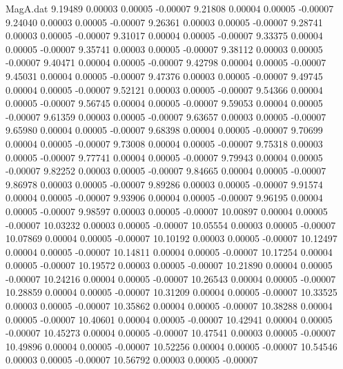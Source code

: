 \begin{filecontents}{MagA.dat}
   9.19489    0.00003    0.00005   -0.00007
   9.21808    0.00004    0.00005   -0.00007
   9.24040    0.00003    0.00005   -0.00007
   9.26361    0.00003    0.00005   -0.00007
   9.28741    0.00003    0.00005   -0.00007
   9.31017    0.00004    0.00005   -0.00007
   9.33375    0.00004    0.00005   -0.00007
   9.35741    0.00003    0.00005   -0.00007
   9.38112    0.00003    0.00005   -0.00007
   9.40471    0.00004    0.00005   -0.00007
   9.42798    0.00004    0.00005   -0.00007
   9.45031    0.00004    0.00005   -0.00007
   9.47376    0.00003    0.00005   -0.00007
   9.49745    0.00004    0.00005   -0.00007
   9.52121    0.00003    0.00005   -0.00007
   9.54366    0.00004    0.00005   -0.00007
   9.56745    0.00004    0.00005   -0.00007
   9.59053    0.00004    0.00005   -0.00007
   9.61359    0.00003    0.00005   -0.00007
   9.63657    0.00003    0.00005   -0.00007
   9.65980    0.00004    0.00005   -0.00007
   9.68398    0.00004    0.00005   -0.00007
   9.70699    0.00004    0.00005   -0.00007
   9.73008    0.00004    0.00005   -0.00007
   9.75318    0.00003    0.00005   -0.00007
   9.77741    0.00004    0.00005   -0.00007
   9.79943    0.00004    0.00005   -0.00007
   9.82252    0.00003    0.00005   -0.00007
   9.84665    0.00004    0.00005   -0.00007
   9.86978    0.00003    0.00005   -0.00007
   9.89286    0.00003    0.00005   -0.00007
   9.91574    0.00004    0.00005   -0.00007
   9.93906    0.00004    0.00005   -0.00007
   9.96195    0.00004    0.00005   -0.00007
   9.98597    0.00003    0.00005   -0.00007
  10.00897    0.00004    0.00005   -0.00007
  10.03232    0.00003    0.00005   -0.00007
  10.05554    0.00003    0.00005   -0.00007
  10.07869    0.00004    0.00005   -0.00007
  10.10192    0.00003    0.00005   -0.00007
  10.12497    0.00004    0.00005   -0.00007
  10.14811    0.00004    0.00005   -0.00007
  10.17254    0.00004    0.00005   -0.00007
  10.19572    0.00003    0.00005   -0.00007
  10.21890    0.00004    0.00005   -0.00007
  10.24216    0.00004    0.00005   -0.00007
  10.26543    0.00004    0.00005   -0.00007
  10.28859    0.00004    0.00005   -0.00007
  10.31209    0.00004    0.00005   -0.00007
  10.33525    0.00003    0.00005   -0.00007
  10.35862    0.00004    0.00005   -0.00007
  10.38288    0.00004    0.00005   -0.00007
  10.40601    0.00004    0.00005   -0.00007
  10.42941    0.00004    0.00005   -0.00007
  10.45273    0.00004    0.00005   -0.00007
  10.47541    0.00003    0.00005   -0.00007
  10.49896    0.00004    0.00005   -0.00007
  10.52256    0.00004    0.00005   -0.00007
  10.54546    0.00003    0.00005   -0.00007
  10.56792    0.00003    0.00005   -0.00007

\end{filecontents}
